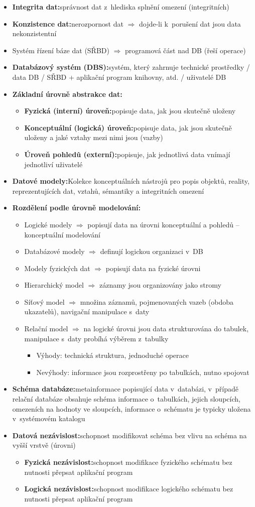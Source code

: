 \documentclass[a4paper,10pt]{article}
\newcommand{\pojem}[2]{\item \textbf{#1:}\quad #2}
\newcommand{\tedy}{$\Rightarrow$ }
\begin{document}
\begin{itemize}
      \pojem{Integrita dat}{správnost dat z~hlediska splnění omezení (integritních)}
      \pojem{Konzistence dat}{nerozpornost dat \tedy dojde-li k~porušení dat jsou data nekonzistentní}
      \item Systém řízení báze dat (SŘBD) \tedy programová část nad DB (řeší operace)
      \pojem{Databázový systém (DBS)}{systém, který zahrnuje technické prostředky / data DB / SŘBD + aplikační program knihovny, atd. / uživatelé DB}
      \pojem{Základní úrovně abstrakce dat}
      \begin{itemize}
        \pojem{Fyzická (interní) úroveň}{popisuje data, jak jsou skutečně uloženy}
        \pojem{Konceptuální (logická) úroveň}{popisuje data, jak jsou skutečně uloženy a jaké vztahy mezi nimi jsou (vazby)}
        \pojem{Úroveň pohledů (externí)}{popisuje, jak jednotlivá data vnímají jednotliví uživatelé}
      \end{itemize}
      \pojem{Datové modely}{Kolekce konceptuálních nástrojů pro popis objektů, reality, reprezentujících dat, vztahů, sémantiky a integritních omezení}
      \pojem{Rozdělení podle úrovně modelování}
      \begin{itemize}
        \item Logické modely \tedy popisují data na úrovni konceptuální a pohledů -- konceptuální modelování
        \item Databázové modely \tedy definují logickou organizaci v~DB
        \item Modely fyzických dat \tedy popisují data na fyzické úrovni
        \item Hierarchický model \tedy záznamy jsou organizovány jako stromy
        \item Síťový model \tedy množina záznamů, pojmenovaných vazeb (obdoba ukazatelů), navigační manipulace s~daty
        \item Relační model \tedy na logické úrovni jsou data strukturována do tabulek, manipulace s~daty probíhá výběrem z~tabulky
        \begin{itemize}
          \item Výhody: technická struktura, jednoduché operace
          \item Nevýhody: informace jsou rozprostřeny po tabulkách, nutno spojovat
        \end{itemize}
      \end{itemize}

      \pojem{Schéma databáze}{metainformace popisující data v~databázi, v~případě relační databáze obsahuje schéma informace o~tabulkách, jejich sloupcích, omezeních na hodnoty ve sloupcích, informace o~schématu je typicky uložena v~systémovém katalogu}
      \pojem{Datová nezávislost}{schopnost modifikovat schéma bez vlivu na schéma na vyšší vrstvě (úrovni)}
      \begin{itemize}
        \pojem{Fyzická nezávislost}{schopnost modifikace fyzického schématu bez nutnosti přepsat aplikační program}
        \pojem{Logická nezávislost}{schopnost modifikace logického schématu bez nutnosti přepsat aplikační program}
      \end{itemize}
    \end{itemize}
\end{document}

